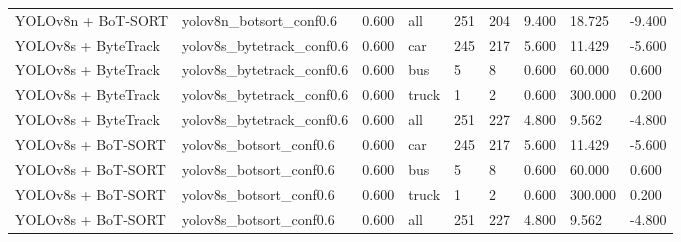 \begin{tabular}{lllllllll}
YOLOv8n + BoT-SORT & yolov8n\_botsort\_conf0.6 & 0.600 & all & 251 & 204 & 9.400 & 18.725 & -9.400 \\
YOLOv8s + ByteTrack & yolov8s\_bytetrack\_conf0.6 & 0.600 & car & 245 & 217 & 5.600 & 11.429 & -5.600 \\
YOLOv8s + ByteTrack & yolov8s\_bytetrack\_conf0.6 & 0.600 & bus & 5 & 8 & 0.600 & 60.000 & 0.600 \\
YOLOv8s + ByteTrack & yolov8s\_bytetrack\_conf0.6 & 0.600 & truck & 1 & 2 & 0.600 & 300.000 & 0.200 \\
YOLOv8s + ByteTrack & yolov8s\_bytetrack\_conf0.6 & 0.600 & all & 251 & 227 & 4.800 & 9.562 & -4.800 \\
YOLOv8s + BoT-SORT & yolov8s\_botsort\_conf0.6 & 0.600 & car & 245 & 217 & 5.600 & 11.429 & -5.600 \\
YOLOv8s + BoT-SORT & yolov8s\_botsort\_conf0.6 & 0.600 & bus & 5 & 8 & 0.600 & 60.000 & 0.600 \\
YOLOv8s + BoT-SORT & yolov8s\_botsort\_conf0.6 & 0.600 & truck & 1 & 2 & 0.600 & 300.000 & 0.200 \\
YOLOv8s + BoT-SORT & yolov8s\_botsort\_conf0.6 & 0.600 & all & 251 & 227 & 4.800 & 9.562 & -4.800 \\
\bottomrule
\end{tabular}
